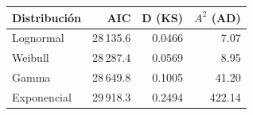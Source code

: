 \begin{tabular}{lrrr}
\toprule
\textbf{Distribución} & \textbf{AIC} & \textbf{D (KS)} & \textbf{$A^2$ (AD)} \\ \midrule
Lognormal & 28\,135.6 & 0.0466 & 7.07 \\
Weibull & 28\,287.4 & 0.0569 & 8.95 \\
Gamma & 28\,649.8 & 0.1005 & 41.20 \\
Exponencial & 29\,918.3 & 0.2494 & 422.14 \\
\bottomrule
\end{tabular}